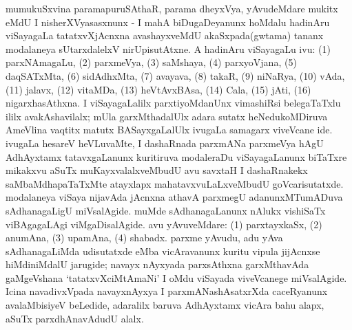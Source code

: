 mumukuSxvina paramapuruSAthaR, parama dheyxVya, yAvudeMdare mukitx eMdU I nisherXVyasasxnunx - I mahA biDugaDeyanunx hoMdalu hadinAru viSayagaLa tatatxvXjAcnxna avashayxveMdU akaSxpada(gwtama) tananx modalaneya sUtarxdalelxV nirUpisutAtxne. A hadinAru viSayagaLu ivu: (1) parxNAmagaLu, (2) parxmeVya, (3) saMshaya, (4) parxyoVjana, (5) daqSATxMta, (6) sidAdhxMta, (7) avayava, (8) takaR, (9) niNaRya, (10) vAda, (11) jalavx, (12) vitaMDa, (13) heVtAvxBAsa, (14) Cala, (15) jAti, (16) nigarxhasAthxna. I viSayagaLalilx parxtiyoMdanUnx vimashiRsi belegaTaTxlu ililx avakAshavilalx; mUla garxMthadalUlx adara sutatx heNedukoMDiruva AmeVlina vaqtitx matutx BASayxgaLalUlx ivugaLa samagarx viveVcane ide. ivugaLa hesareV heVLuvaMte, I dashaRnada parxmANa parxmeVya hAgU AdhAyxtamx tatavxgaLanunx kuritiruva modaleraDu viSayagaLanunx biTaTxre mikakxvu aSuTx muKayxvalalxveMbudU avu savxtaH I dashaRnakekx saMbaMdhapaTaTxMte atayxlapx mahatavxvuLaLxveMbudU goVcarisutatxde. modalaneya viSaya nijavAda jAcnxna athavA parxmegU adanunxMTumADuva sAdhanagaLigU miVsalAgide. muMde sAdhanagaLanunx nAlukx vishiSaTx viBAgagaLAgi viMgaDisalAgide. avu yAvuveMdare: (1) parxtayxkaSx, (2) anumAna, (3) upamAna, (4) shabadx. parxme yAvudu, adu yAva sAdhanagaLiMda udisutatxde eMba vicAravanunx kuritu vipula jijAcnxse hiMdiniMdalU jarugide; navayx nAyxyada parxsAthxna garxMthavAda gaMgeVshana `tatatxvXciMtAmaNi' I oMdu viSayada viveVcanege miVsalAgide. Icina navadivxVpada navayxnAyxya I parxmANashAsatxrXda caceRyanunx avalaMbisiyeV beLedide, adaralilx baruva AdhAyxtamx vicAra bahu alapx, aSuTx parxdhAnavAdudU alalx.

